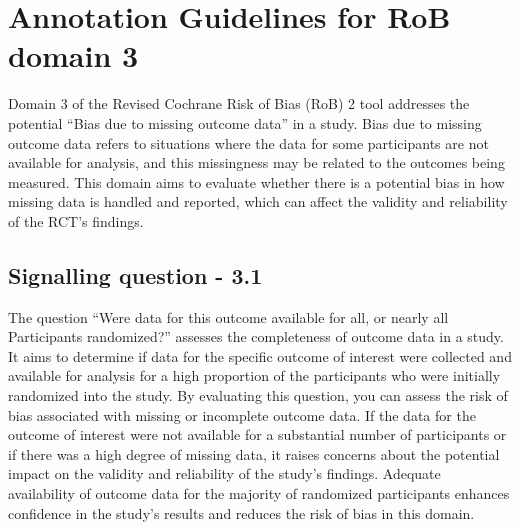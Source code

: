 \documentclass[sn-mathphys,Numbered]{sn-jnl}%
\begin{document}
%
%
%
\section*{Annotation Guidelines for RoB domain 3}
\label{sec:dom3}
%
Domain 3 of the Revised Cochrane Risk of Bias (RoB) 2 tool addresses the potential ``Bias due to missing outcome data'' in a study.
Bias due to missing outcome data refers to situations where the data for some participants are not available for analysis, and this missingness may be related to the outcomes being measured.
This domain aims to evaluate whether there is a potential bias in how missing data is handled and reported, which can affect the validity and reliability of the RCT's findings.
%
%
%
\subsection*{Signalling question - 3.1 }
%
The question ``Were data for this outcome available for all, or nearly all Participants randomized?'' assesses the completeness of outcome data in a study.
It aims to determine if data for the specific outcome of interest were collected and available for analysis for a high proportion of the participants who were initially randomized into the study.
By evaluating this question, you can assess the risk of bias associated with missing or incomplete outcome data.
If the data for the outcome of interest were not available for a substantial number of participants or if there was a high degree of missing data, it raises concerns about the potential impact on the validity and reliability of the study's findings.
Adequate availability of outcome data for the majority of randomized participants enhances confidence in the study's results and reduces the risk of bias in this domain.
\end{document}
